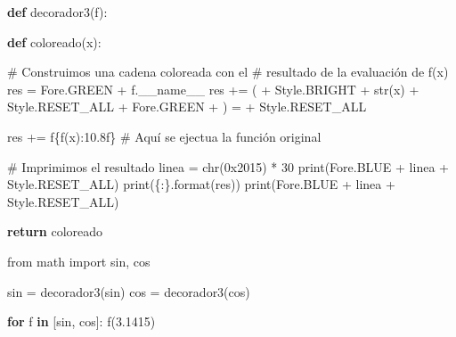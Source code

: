 \documentclass[
  spanish,
  letterpaper,
]{scrbook}
\newenvironment{Shaded}{\begin{snugshade}}{\end{snugshade}}
\newcommand{\BaseNTok}[1]{\textcolor[rgb]{0.68,0.00,0.00}{#1}}
\newcommand{\BuiltInTok}[1]{\textcolor[rgb]{0.00,0.23,0.31}{#1}}
\newcommand{\CommentTok}[1]{\textcolor[rgb]{0.37,0.37,0.37}{#1}}
\newcommand{\ControlFlowTok}[1]{\textcolor[rgb]{0.00,0.23,0.31}{\textbf{#1}}}
\newcommand{\DecValTok}[1]{\textcolor[rgb]{0.68,0.00,0.00}{#1}}
\newcommand{\FloatTok}[1]{\textcolor[rgb]{0.68,0.00,0.00}{#1}}
\newcommand{\ImportTok}[1]{\textcolor[rgb]{0.00,0.46,0.62}{#1}}
\newcommand{\KeywordTok}[1]{\textcolor[rgb]{0.00,0.23,0.31}{\textbf{#1}}}
\newcommand{\NormalTok}[1]{\textcolor[rgb]{0.00,0.23,0.31}{#1}}
\newcommand{\OperatorTok}[1]{\textcolor[rgb]{0.37,0.37,0.37}{#1}}
\newcommand{\SpecialCharTok}[1]{\textcolor[rgb]{0.37,0.37,0.37}{#1}}
\newcommand{\SpecialStringTok}[1]{\textcolor[rgb]{0.13,0.47,0.30}{#1}}
\newcommand{\StringTok}[1]{\textcolor[rgb]{0.13,0.47,0.30}{#1}}
\newcommand{\VariableTok}[1]{\textcolor[rgb]{0.07,0.07,0.07}{#1}}
\theoremstyle{definition}
\theoremstyle{remark}
\begin{document}
\begin{Shaded}
\begin{Highlighting}[]
\KeywordTok{def}\NormalTok{ decorador3(f):}

    \KeywordTok{def}\NormalTok{ coloreado(x):}

        \CommentTok{\# Construimos una cadena coloreada con el }
        \CommentTok{\# resultado de la evaluación de f(x)}
\NormalTok{        res }\OperatorTok{=}\NormalTok{ Fore.GREEN }\OperatorTok{+}\NormalTok{ f.}\VariableTok{\_\_name\_\_} 
\NormalTok{        res }\OperatorTok{+=} \StringTok{\textquotesingle{}(\textquotesingle{}} \OperatorTok{+}\NormalTok{ Style.BRIGHT }\OperatorTok{+} \BuiltInTok{str}\NormalTok{(x) }\OperatorTok{+}\NormalTok{ Style.RESET\_ALL }\OperatorTok{+}\NormalTok{ Fore.GREEN }\OperatorTok{+} \StringTok{\textquotesingle{}) = \textquotesingle{}} \OperatorTok{+}\NormalTok{ Style.RESET\_ALL}
        
\NormalTok{        res }\OperatorTok{+=} \SpecialStringTok{f\textquotesingle{}}\SpecialCharTok{\{}\NormalTok{f(x)}\SpecialCharTok{:10.8f\}}\SpecialStringTok{\textquotesingle{}} \CommentTok{\# Aquí se ejectua la función original}

        \CommentTok{\# Imprimimos el resultado}
\NormalTok{        linea }\OperatorTok{=} \BuiltInTok{chr}\NormalTok{(}\BaseNTok{0x2015}\NormalTok{) }\OperatorTok{*} \DecValTok{30}
        \BuiltInTok{print}\NormalTok{(Fore.BLUE }\OperatorTok{+}\NormalTok{ linea }\OperatorTok{+}\NormalTok{ Style.RESET\_ALL)}
        \BuiltInTok{print}\NormalTok{(}\StringTok{\textquotesingle{}}\SpecialCharTok{\{:\}}\StringTok{\textquotesingle{}}\NormalTok{.}\BuiltInTok{format}\NormalTok{(res))}
        \BuiltInTok{print}\NormalTok{(Fore.BLUE }\OperatorTok{+}\NormalTok{ linea }\OperatorTok{+}\NormalTok{ Style.RESET\_ALL)}

    \ControlFlowTok{return}\NormalTok{ coloreado}
\end{Highlighting}
\end{Shaded}

\begin{Shaded}
\begin{Highlighting}[]
\ImportTok{from}\NormalTok{ math }\ImportTok{import}\NormalTok{ sin, cos}

\NormalTok{sin }\OperatorTok{=}\NormalTok{ decorador3(sin)}
\NormalTok{cos }\OperatorTok{=}\NormalTok{ decorador3(cos)}

\ControlFlowTok{for}\NormalTok{ f }\KeywordTok{in}\NormalTok{ [sin, cos]:}
\NormalTok{    f(}\FloatTok{3.1415}\NormalTok{)}
\end{Highlighting}
\end{Shaded}
\end{document}
